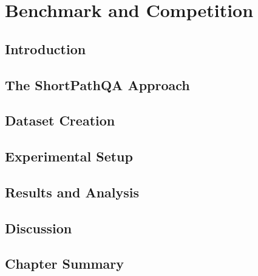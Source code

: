 \chapter{Benchmark and Competition}
\label{ch:shortpathqa}

\section{Introduction}
\label{sec:shortpath:intro}

\section{The ShortPathQA Approach}
\label{sec:shortpath:method}

\section{Dataset Creation}
\label{sec:shortpath:dataset}

\section{Experimental Setup}
\label{sec:shortpath:setup}

\section{Results and Analysis}
\label{sec:shortpath:results}

\section{Discussion}
\label{sec:shortpath:discussion}

\section{Chapter Summary}
\label{sec:shortpath:summary}
